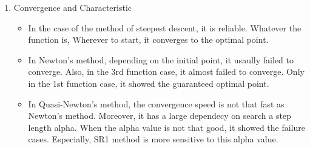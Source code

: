 \documentclass{standalone}
\begin{document}
\begin{enumerate}
    \item Convergence and Characteristic
    \begin{itemize}
        \item In the case of the method of steepest descent, it is reliable.
        Whatever the function is, Wherever to start, it converges to the optimal point.
        \item In Newton's method, depending on the initial point, it usaully failed to converge.
        Also, in the 3rd function case, it almost failed to converge. 
        Only in the 1st function case, it showed the guaranteed optimal point.
        \item In Quasi-Newton's method, the convergence speed is not that fast as Newton's method.
        Moreover, it has a large dependecy on search a step length alpha. When the alpha value is not that good, 
        it showed the failure cases. Especially, SR1 method is more sensitive to this alpha value.
    \end{itemize}
\end{enumerate}
    
\end{document}
